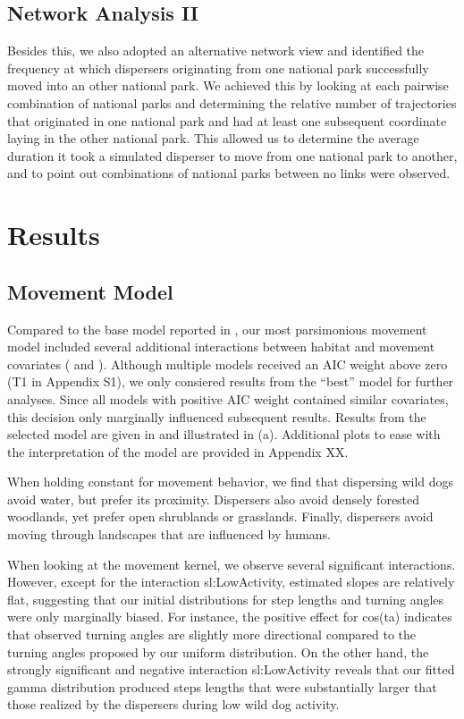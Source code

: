\documentclass[abstract=on,10pt,a4paper,bibliography=totocnumbered]{article}
\begin{document}
\subsection{Network Analysis II}
Besides this, we also adopted an alternative network view and identified the
frequency at which dispersers originating from one national park successfully
moved into an other national park. We achieved this by looking at each pairwise
combination of national parks and determining the relative number of
trajectories that originated in one national park and had at least one
subsequent coordinate laying in the other national park. This allowed us to
determine the average duration it took a simulated disperser to move from one
national park to another, and to point out combinations of national parks
between no links were observed.

\section{Results}
\subsection{Movement Model}
Compared to the base model reported in \citep{Hofmann.2021}, our most
parsimonious movement model included several additional interactions between
habitat and movement covariates ( and
). Although multiple models received an AIC weight
above zero (T1 in Appendix S1), we only consiered results from the  ``best''
model for further analyses. Since all models with positive AIC weight contained
similar covariates, this decision only marginally influenced subsequent results.
Results from the selected model are given in  and
illustrated in  (a). Additional plots to ease with the
interpretation of the model are provided in Appendix XX.

When holding constant for movement behavior, we find that dispersing wild dogs
avoid water, but prefer its proximity. Dispersers also avoid densely forested
woodlands, yet prefer open shrublands or grasslands. Finally, dispersers avoid
moving through landscapes that are influenced by humans.

When looking at the movement kernel, we observe several significant
interactions. However, except for the interaction \textsf{sl:LowActivity},
estimated slopes are relatively flat, suggesting that our initial distributions
for step lengths and turning angles were only marginally biased. For instance,
the positive effect for \textsf{cos(ta)} indicates that observed turning angles
are slightly more directional compared to the turning angles proposed by our
uniform distribution. On the other hand, the strongly significant and negative
interaction \textsf{sl:LowActivity} reveals that our fitted gamma distribution
produced steps lengths that were substantially larger that those realized by the
dispersers during low wild dog activity.
\end{document}
